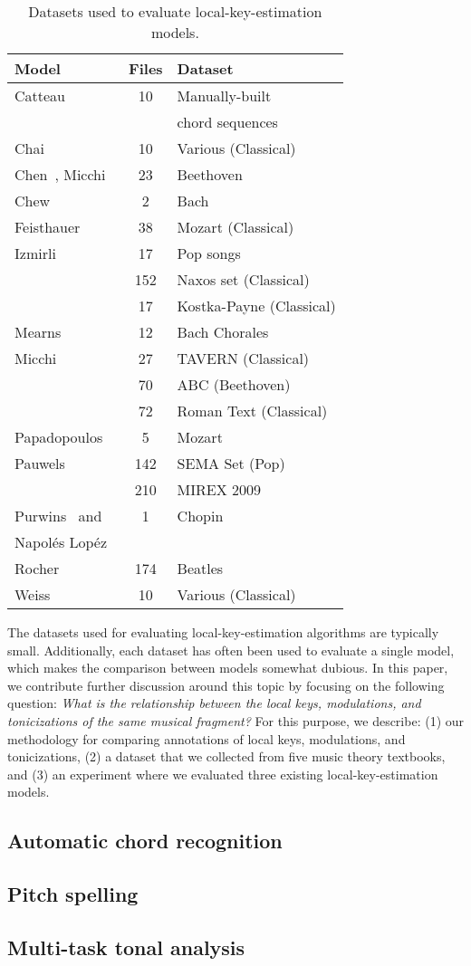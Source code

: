 \begin{table}
  \caption{Datasets used to evaluate local-key-estimation models.}
  \label{tab:corpus}
  \begin{tabular}{lcl}
    \toprule
    Model&Files&Dataset\\
    \midrule
    Catteau~\cite{Catteau07tonalkey} & 10 & Manually-built\\
    & & chord sequences\\
    Chai~\cite{chai_detection_2005} & 10 & Various (Classical)\\
    Chen~\cite{chen18harmony,chen19harmony}, Micchi~\cite{Micchi20:roman} & 23 & Beethoven\\
    Chew~\cite{chew2002key} & 2 & Bach\\
    Feisthauer~\cite{feisthauer2020smc} & 38 & Mozart (Classical) \\
    Izmirli~\cite{izmirli_localized_2007} & 17 & Pop songs\\
    & 152 & Naxos set (Classical)\\
    & 17 & Kostka-Payne (Classical)\\
    Mearns~\cite{mearns2011automatically} & 12 & Bach Chorales \\
    Micchi~\cite{Micchi20:roman} &  27 &  TAVERN (Classical)\\
    & 70 & ABC (Beethoven)\\ 
    & 72 & Roman Text (Classical)\\
    Papadopoulos~\cite{papadopoulos_local_2009} & 5 & Mozart\\
    Pauwels~\cite{pauwels_combining_2014} & 142 & SEMA Set (Pop)\\
    & 210 & MIREX 2009\\
    Purwins~\cite{purwins_new_2000} and & 1 & Chopin\\
    Napol\'{e}s Lop\'{e}z~\cite{napoleslopez2019key} & & \\
    Rocher~\cite{thomas_rocher_2010_1417485} & 174 & Beatles\\
    Weiss~\cite{weiss2014chroma} & 10 & Various (Classical) \\
  \bottomrule
\end{tabular}
\end{table}

The datasets used for evaluating local-key-estimation algorithms are typically small. 
Additionally, each dataset has often been used to evaluate a single model, which makes the comparison between models somewhat dubious. 
In this paper, we contribute further discussion around this topic by focusing on the following question: \emph{What is the relationship between the local keys, modulations, and tonicizations of the same musical fragment?} 
For this purpose, we describe: (1) our methodology for comparing annotations of local keys, modulations, and tonicizations, (2) a dataset that we collected from five music theory textbooks, and (3) an experiment where we evaluated three existing local-key-estimation models.

\subsection{Automatic chord recognition}
\subsection{Pitch spelling}
\subsection{Multi-task tonal analysis}